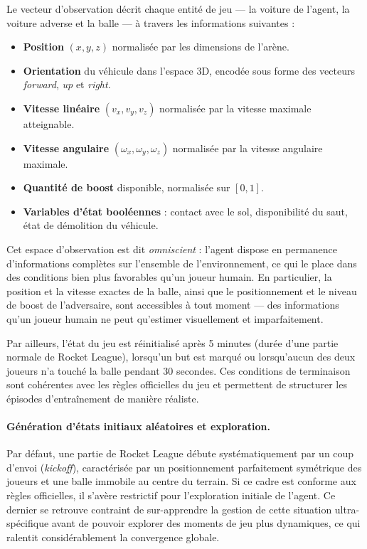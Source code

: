 Le vecteur d'observation décrit chaque entité de jeu — la voiture de l'agent, la voiture adverse et la balle — à travers les informations suivantes :

\begin{itemize}
    \item \textbf{Position} $(x, y, z)$ normalisée par les dimensions de l'arène.
    \item \textbf{Orientation} du véhicule dans l'espace 3D, encodée sous forme des vecteurs \textit{forward}, \textit{up} et \textit{right}.
    \item \textbf{Vitesse linéaire} $(v_x, v_y, v_z)$ normalisée par la vitesse maximale atteignable.
    \item \textbf{Vitesse angulaire} $(\omega_x, \omega_y, \omega_z)$ normalisée par la vitesse angulaire maximale.
    \item \textbf{Quantité de boost} disponible, normalisée sur $[0, 1]$.
    \item \textbf{Variables d'état booléennes} : contact avec le sol, disponibilité du saut, état de démolition du véhicule.
\end{itemize}

Cet espace d'observation est dit \textit{omniscient} : l'agent dispose en permanence d'informations complètes sur l'ensemble de l'environnement, ce qui le place dans des conditions bien plus favorables qu'un joueur humain. En particulier, la position et la vitesse exactes de la balle, ainsi que le positionnement et le niveau de boost de l'adversaire, sont accessibles à tout moment — des informations qu'un joueur humain ne peut qu'estimer visuellement et imparfaitement.

Par ailleurs, l'état du jeu est réinitialisé après 5 minutes (durée d'une partie normale de Rocket League), lorsqu'un but est marqué ou lorsqu'aucun des deux joueurs n'a touché la balle pendant 30 secondes. Ces conditions de terminaison sont cohérentes avec les règles officielles du jeu et permettent de structurer les épisodes d'entraînement de manière réaliste.

\paragraph{Génération d'états initiaux aléatoires et exploration.}
Par défaut, une partie de Rocket League débute systématiquement par un coup d'envoi (\textit{kickoff}), caractérisée par un positionnement parfaitement symétrique des joueurs et une balle immobile au centre du terrain. Si ce cadre est conforme aux règles officielles, il s'avère restrictif pour l'exploration initiale de l'agent. Ce dernier se retrouve contraint de sur-apprendre la gestion de cette situation ultra-spécifique avant de pouvoir explorer des moments de jeu plus dynamiques, ce qui ralentit considérablement la convergence globale. 

